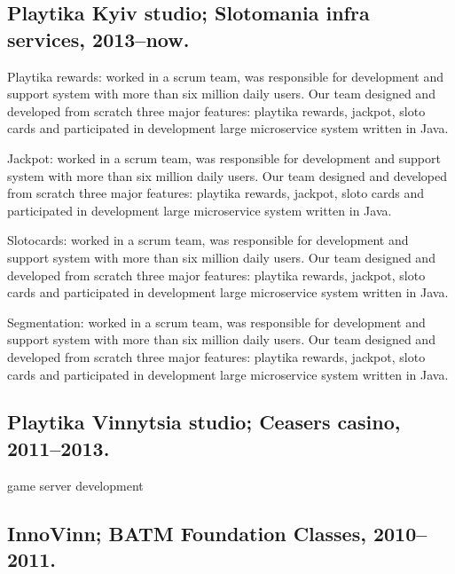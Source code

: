 \documentclass[letterpaper]{article}
\renewenvironment{itemize}{
  \begin{list}{}{
    \setlength{\leftmargin}{1.5em}
  }
}{
  \end{list}
}
\begin{document}
\subsection*{Playtika Kyiv studio; Slotomania infra services, 2013--now.}

\begin{itemize}
\item {\large Playtika rewards: } worked in a scrum team, was responsible for development and support system with more than six million daily users. Our team designed and developed from scratch three major features: playtika rewards, jackpot, sloto cards and participated in development large microservice system written in Java.
\item {\large Jackpot: } worked in a scrum team, was responsible for development and support system with more than six million daily users. Our team designed and developed from scratch three major features: playtika rewards, jackpot, sloto cards and participated in development large microservice system written in Java.  
\item {\large Slotocards: } worked in a scrum team, was responsible for development and support system with more than six million daily users. Our team designed and developed from scratch three major features: playtika rewards, jackpot, sloto cards and participated in development large microservice system written in Java.  
\item {\large Segmentation: } worked in a scrum team, was responsible for development and support system with more than six million daily users. Our team designed and developed from scratch three major features: playtika rewards, jackpot, sloto cards and participated in development large microservice system written in Java.  
\end{itemize}

\subsection*{Playtika Vinnytsia studio; Ceasers casino, 2011--2013.}

\begin{itemize}
\item game server development
\end{itemize}

\subsection*{InnoVinn; BATM Foundation Classes, 2010--2011.}
\end{document}
